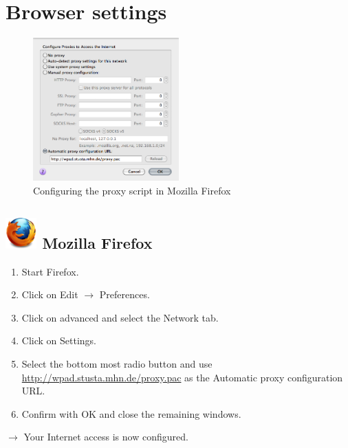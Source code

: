 \documentclass[a4paper,12pt]{scrartcl}
\begin{document}
\newpage

\section*{Browser settings}

\begin{figure}
  \begin{center}
    \includegraphics[width=0.5\textwidth,keepaspectratio]{Bilder/Proxy_Firefox_EN}
  \end{center}
  \caption{Configuring the proxy script in Mozilla Firefox}
\end{figure}

\subsection*{\includegraphics[height=1.2cm,keepaspectratio]{Bilder/Firefox_35_logo} Mozilla Firefox}
\begin{enumerate}
    \item Start Firefox.
    \item Click on Edit $\rightarrow$ Preferences.
    \item Click on advanced and select the Network tab.
    \item Click on Settings.
    \item Select the bottom most radio button and use \\ \url{http://wpad.stusta.mhn.de/proxy.pac} as the Automatic proxy configuration URL.
    \item Confirm with OK and close the remaining windows.
\end{enumerate}
$\rightarrow$ Your Internet access is now configured.
\end{document}

